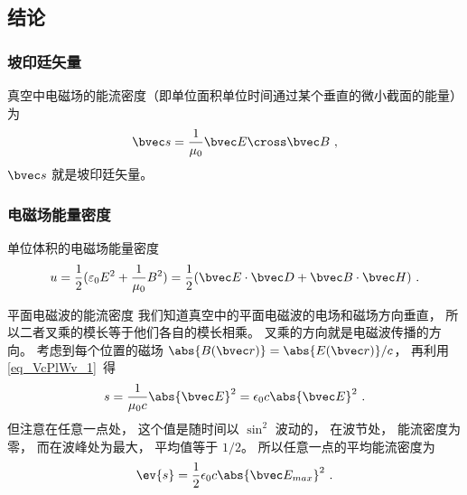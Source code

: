 



\subsection{结论}

\subsubsection{坡印廷矢量}
真空中电磁场的能流密度（即单位面积单位时间通过某个垂直的微小截面的能量）为 %
\begin{equation}
\bvec s = \frac{1}{\mu_0} \bvec E \cross \bvec B~,
\end{equation} 
$\bvec s$ 就是坡印廷矢量。

\subsubsection{电磁场能量密度}
单位体积的电磁场能量密度\cite{GriffE}
\begin{equation}
u=\frac{1}{2}(\varepsilon_0 E^2+ \frac{1}{\mu_0} B^2)=\frac{1}{2} (\bvec E \cdot \bvec D + \bvec B \cdot \bvec H)~.
\end{equation} 

\begin{example}{平面电磁波的能流密度}\label{ex_EBS_1}
我们知道真空中的平面电磁波的电场和磁场方向垂直， 所以二者叉乘的模长等于他们各自的模长相乘。 叉乘的方向就是电磁波传播的方向。 考虑到每个位置的磁场 $\abs{B(\bvec r)} = \abs{E(\bvec r)}/c$， 再利用\autoref{eq_VcPlWv_1}~得
\begin{equation}
s = \frac{1}{\mu_0 c} \abs{\bvec E}^2 = \epsilon_0 c \abs{\bvec E}^2~.
\end{equation}
但注意在任意一点处， 这个值是随时间以 $\sin^2$ 波动的， 在波节处， 能流密度为零， 而在波峰处为最大， 平均值等于 $1/2$。 %
所以任意一点的平均能流密度为
\begin{equation}
\ev{s} = \frac{1}{2} \epsilon_0 c \abs{\bvec E_{max}}^2~.
\end{equation}
\end{example}

